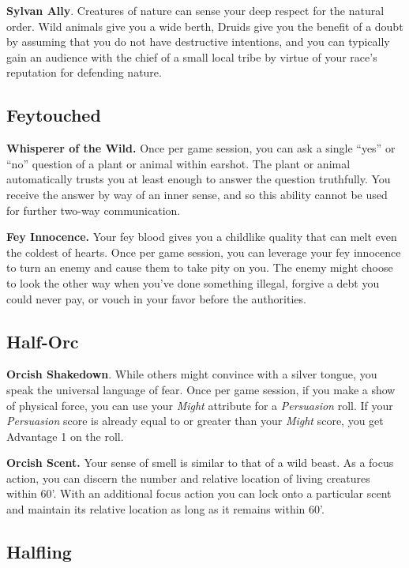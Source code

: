 \documentclass[12pt]{report}
\begin{document}
\textbf{Sylvan Ally}. Creatures of nature can sense your deep respect
for the natural order. Wild animals give you a wide berth, Druids give
you the benefit of a doubt by assuming that you do not have destructive
intentions, and you can typically gain an audience with the chief of a
small local tribe by virtue of your race's reputation for defending
nature.

\subsection{Feytouched}\label{feytouched}

\textbf{Whisperer of the Wild.} Once per game session, you can ask a
single ``yes'' or ``no'' question of a plant or animal within earshot.
The plant or animal automatically trusts you at least enough to answer
the question truthfully. You receive the answer by way of an inner
sense, and so this ability cannot be used for further two-way
communication.

\textbf{Fey Innocence.} Your fey blood gives you a childlike quality
that can melt even the coldest of hearts. Once per game session, you can
leverage your fey innocence to turn an enemy and cause them to take pity
on you. The enemy might choose to look the other way when you've done
something illegal, forgive a debt you could never pay, or vouch in your
favor before the authorities.

\subsection{Half-Orc}\label{half-orc}

\textbf{Orcish Shakedown}. While others might convince with a silver
tongue, you speak the universal language of fear. Once per game session,
if you make a show of physical force, you can use your \emph{Might}
attribute for a \emph{Persuasion} roll. If your \emph{Persuasion} score
is already equal to or greater than your \emph{Might} score, you get
Advantage 1 on the roll.

\textbf{Orcish Scent.} Your sense of smell is similar to that of a wild
beast. As a focus action, you can discern the number and relative
location of living creatures within 60'. With an additional focus action
you can lock onto a particular scent and maintain its relative location
as long as it remains within 60'.

\subsection{Halfling}\label{halfling}
\end{document}
